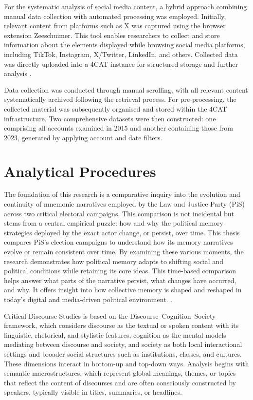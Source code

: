 For the systematic analysis of social media content, a hybrid approach combining manual data collection with automated processing was employed. Initially, relevant content from platforms such as X was captured using the browser extension Zeeschuimer. This tool enables researchers to collect and store information about the elements displayed while browsing social media platforms, including TikTok, Instagram, X/Twitter, LinkedIn, and others. Collected data was directly uploaded into a 4CAT instance for structured storage and further analysis \citep{stijn_peeters_zeeschuimer_2025}.

Data collection was conducted through manual scrolling, with all relevant content systematically archived following the retrieval process. For pre-processing, the collected material was subsequently organised and stored within the 4CAT infrastructure. Two comprehensive datasets were then constructed: one comprising all accounts examined in 2015 and another containing those from 2023, generated by applying account and date filters.


\section{Analytical Procedures}

The foundation of this research is a comparative inquiry into the evolution and continuity of mnemonic narratives employed by the Law and Justice Party (PiS) across two critical electoral campaigns. This comparison is not incidental but stems from a central empirical puzzle: how and why the political memory strategies deployed by the exact actor change, or persist, over time. This thesis compares PiS's election campaigns to understand how its memory narratives evolve or remain consistent over time. By examining these various moments, the research demonstrates how political memory adapts to shifting social and political conditions while retaining its core ideas. This time-based comparison helps answer what parts of the narrative persist, what changes have occurred, and why. It offers insight into how collective memory is shaped and reshaped in today's digital and media-driven political environment. \citep{day_finding_2019}.

Critical Discourse Studies is based on the Discourse–Cognition–Society framework, which considers discourse as the textual or spoken content with its linguistic, rhetorical, and stylistic features, cognition as the mental models mediating between discourse and society, and society as both local interactional settings and broader social structures such as institutions, classes, and cultures. These dimensions interact in bottom-up and top-down ways. Analysis begins with semantic macrostructures, which represent global meanings, themes, or topics that reflect the content of discourses and are often consciously constructed by speakers, typically visible in titles, summaries, or headlines.

